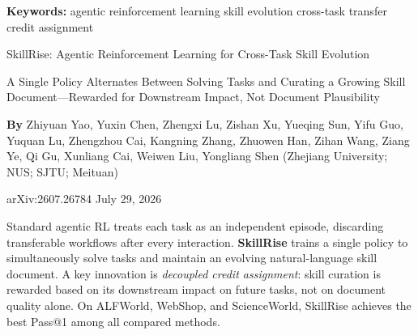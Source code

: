 \documentclass[10pt,twocolumn]{article}
\begin{document}
\setlength{\parindent}{0pt}
\setlength{\parskip}{4pt}

{\small\color{keywordgray}\textbf{Keywords:}
  agentic reinforcement learning \textbullet{}
  skill evolution \textbullet{}
  cross-task transfer \textbullet{}
  credit assignment}\par\vspace{4pt}

{\LARGE\bfseries\raggedright
  SkillRise: Agentic Reinforcement Learning for
  Cross-Task Skill Evolution}\par\vspace{4pt}

{\large\itshape\raggedright
  A Single Policy Alternates Between Solving Tasks and Curating a
  Growing Skill Document---Rewarded for Downstream Impact, Not
  Document Plausibility}\par\vspace{6pt}

{\small\textbf{By} Zhiyuan Yao, Yuxin Chen, Zhengxi Lu, Zishan Xu,
  Yueqing Sun, Yifu Guo, Yuquan Lu, Zhengzhou Cai, Kangning Zhang,
  Zhuowen Han, Zihan Wang, Ziang Ye, Qi Gu, Xunliang Cai,
  Weiwen Liu, Yongliang Shen
  (Zhejiang University; NUS; SJTU; Meituan)}\par\vspace{2pt}

{\small\color{keywordgray}arXiv:2607.26784 \textbullet{} July 29, 2026}
\par\vspace{2pt}\noindent{\color{rulered}\rule{\columnwidth}{0.6pt}}\vspace{6pt}

Standard agentic RL treats each task as an independent episode, discarding
transferable workflows after every interaction. \textbf{SkillRise} trains
a single policy to simultaneously solve tasks and maintain an evolving
natural-language skill document. A key innovation is \emph{decoupled credit
assignment}: skill curation is rewarded based on its downstream impact on
future tasks, not on document quality alone. On ALFWorld, WebShop, and
ScienceWorld, SkillRise achieves the best Pass@1 among all compared methods.
\end{document}
